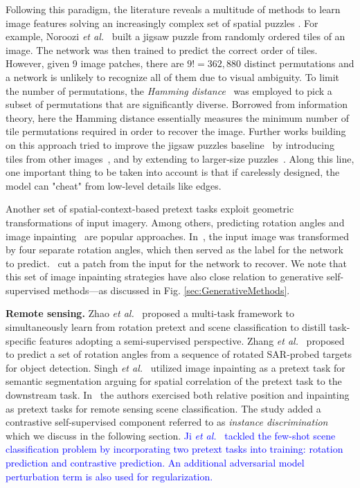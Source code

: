 \documentclass[lettersize,journal]{IEEEtran}
\newcommand{\etal}{\textit{et al.}}
\begin{document}
Following this paradigm, the literature reveals a multitude of methods to learn image features solving an increasingly complex set of spatial puzzles
\cite{noroozi2016unsupervised,wei2019iterative,noroozi2018boosting,santa2018visual,Chen_2021_CVPR}. For example, Noroozi \etal~\cite{noroozi2016unsupervised} built a jigsaw puzzle from randomly ordered tiles of an image. The network was then trained to predict the correct order of tiles. However, given 9 image patches, there are $9!=362,880$ distinct permutations and a network is unlikely to recognize all of them due to visual ambiguity. To limit the number of permutations, the
\textit{Hamming distance}~\cite{6772729} was employed to pick a subset of permutations that are significantly diverse. Borrowed from information theory, here the Hamming distance essentially measures the minimum number of tile permutations required in order to recover the image. Further works building on this approach tried to improve the jigsaw puzzles baseline~\cite{wei2019iterative} by introducing tiles from other images~\cite{noroozi2018boosting,Chen_2021_CVPR}, and by
extending to larger-size puzzles~\cite{santa2018visual}. Along this line, one important thing to be taken into account is that if carelessly designed, the model can "cheat" from low-level details like edges.

Another set of spatial-context-based pretext tasks exploit geometric transformations of input imagery. Among others, predicting rotation angles
\cite{gidaris2018unsupervised,feng2019self} and image inpainting~\cite{pathak2016context,iizuka2017globally}
are popular approaches. In~\cite{gidaris2018unsupervised}, the input image was transformed by four separate rotation angles, which then served as the label for the network to predict.~\cite{pathak2016context} cut a patch from the input for the network to recover. We note that this set of image inpainting strategies have also close relation to generative self-supervised methods---as discussed in Fig. \ref{sec:GenerativeMethods}.

\textbf{Remote sensing.} Zhao \etal~\cite{zhao2020self} proposed a multi-task framework to simultaneously learn from rotation pretext and scene classification to distill task-specific features adopting a semi-supervised perspective. Zhang \etal~\cite{zhang2019rotation} proposed to predict a set of rotation angles from a sequence of rotated SAR-probed targets for object detection. Singh \etal~\cite{singh2018self} utilized image inpainting as a pretext task for semantic segmentation arguing for spatial correlation of the pretext task to the downstream task. In~\cite{tao2020remote} the authors exercised both relative position and inpainting as pretext tasks for remote sensing scene classification. The study added a contrastive self-supervised component referred to as \textit{instance discrimination} which
we discuss in the following section. \textcolor{blue}{Ji \etal~\cite{ji2022few} tackled the few-shot scene classification problem by incorporating two pretext tasks into training: rotation prediction and contrastive prediction. An additional adversarial model perturbation term is also used for regularization.} 
\end{document}
